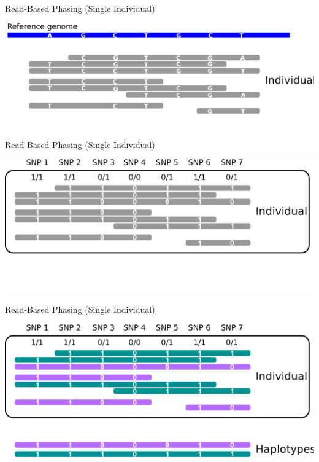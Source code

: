 \documentclass[notes=hide]{beamer}
\begin{document}

\begin{frame}{Read-Based Phasing (Single Individual)}
\begin{center}
\includegraphics[scale=.35]{figs/sih-phasing-complete2.pdf}
\end{center}
\end{frame}


\begin{frame}{Read-Based Phasing (Single Individual)}
\begin{center}
\includegraphics[scale=.35]{figs/sih-phasing-complete1.pdf}
\end{center}
\end{frame}

\begin{frame}{Read-Based Phasing (Single Individual)}
	\begin{center}
		\includegraphics[scale=.35]{figs/sih-phasing-complete-haplo.pdf}		
	\end{center}
\end{frame}
\end{document}
